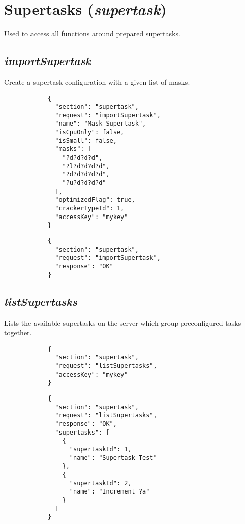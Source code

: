 \section*{Supertasks (\textit{supertask})}
	Used to access all functions around prepared supertasks. 
	\subsection*{\textit{importSupertask}}
		Create a supertask configuration with a given list of masks.
		{
			\color{blue}
			\begin{verbatim}
			{
			  "section": "supertask",
			  "request": "importSupertask",
			  "name": "Mask Supertask",
			  "isCpuOnly": false,
			  "isSmall": false,
			  "masks": [
			    "?d?d?d?d",
			    "?l?d?d?d?d",
			    "?d?d?d?d?d",
			    "?u?d?d?d?d"
			  ],
			  "optimizedFlag": true,
			  "crackerTypeId": 1,
			  "accessKey": "mykey"
			}
			\end{verbatim}
		}
		{
			\color{OliveGreen}
			\begin{verbatim}
			{
			  "section": "supertask",
			  "request": "importSupertask",
			  "response": "OK"
			}
			\end{verbatim}
		}	
	\subsection*{\textit{listSupertasks}}
		Lists the available supertasks on the server which group preconfigured tasks together.
		{
			\color{blue}
			\begin{verbatim}
			{
			  "section": "supertask",
			  "request": "listSupertasks",
			  "accessKey": "mykey"
			}
			\end{verbatim}
		}
		{
			\color{OliveGreen}
			\begin{verbatim}
			{
			  "section": "supertask",
			  "request": "listSupertasks",
			  "response": "OK",
			  "supertasks": [
			    {
			      "supertaskId": 1,
			      "name": "Supertask Test"
			    },
			    {
			      "supertaskId": 2,
			      "name": "Increment ?a"
			    }
			  ]
			}
			\end{verbatim}
		}
